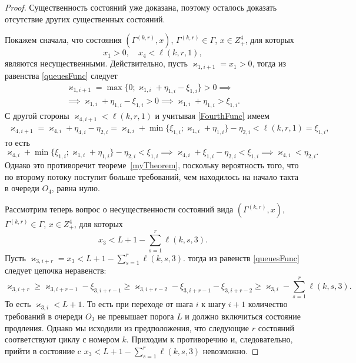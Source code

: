 \begin{proof}
Существенность состояний уже доказана,  поэтому осталось доказать отсутствие других существенных состояний.

Покажем сначала,  что состояния $(\Gamma^{(k, r)}, x)$,  $\Gamma^{(k, r)}\in \Gamma$,  $x\in Z^4_+$,  для которых 
\begin{equation*}
    x_1>0,  \quad x_4 < \ell(k, r, 1), 
\end{equation*}
являются несущественными. Действительно,  пусть $\varkappa_{1, i+1}=x_1 > 0$,  тогда из равенства \eqref{queuesFunc} следует
\begin{multline*}
    \varkappa_{1,  i+1} = \max \{0; \varkappa_{1,  i} + \eta_{1,  i}-\xi_{1,  i}\} > 0 \implies \\ 
    \implies \varkappa_{1,  i} + \eta_{1,  i}-\xi_{1,  i} > 0 \implies  \varkappa_{1,  i} + \eta_{1,  i} > \xi_{1,  i}.
\end{multline*}
С другой стороны $\varkappa_{4,  i+1} < \ell(k,  r,  1)$ и учитывая \eqref{FourthFunc} имеем 
\begin{multline*}
    \varkappa_{4,  i+1} = \varkappa_{4,  i} + \eta_{4,  i} - \eta_{2,  i} =  \varkappa_{4,  i} + \min\{\xi_{1,  i}; \varkappa_{1,  i}+\eta_{1,  i}\} - \eta_{2,  i}  < \ell(k,  r,  1) = \xi_{1,  i}, 
\end{multline*}
то есть 
\begin{equation*}
     \varkappa_{4,  i} + \min\{\xi_{1,  i}; \varkappa_{1,  i}+\eta_{1,  i}\} - \eta_{2,  i} < \xi_{1,  i} \implies      \varkappa_{4, i} + \xi_{1,  i}- \eta_{2,  i} < \xi_{1,  i} \implies  \varkappa_{4,  i} < \eta_{2,  i}.
\end{equation*}
Однако это противоречит теореме~\eqref{myTheorem},  поскольку вероятность того,  что по второму потоку поступит больше требований,  чем находилось на начало такта в очереди $O_4$,  равна нулю.

Рассмотрим теперь вопрос о несущественности состояний вида $(\Gamma^{(k,  r)},  x)$,  $\Gamma^{(k,  r)}\in \Gamma$,  $x\in Z^4_+$,  для которых 
\begin{equation*}
    x_3< L + 1 - \sum_{s=1}^r \ell(k, s, 3).
\end{equation*}
Пусть $\varkappa_{3,  i+r}=x_3 < L + 1 - \sum_{s=1}^r \ell(k,  s,  3)$. тогда из равенств \eqref{queuesFunc} следует цепочка неравенств:
\begin{equation*}
    \varkappa_{3, i+r} \geqslant \varkappa_{3,  i+r-1} - \xi_{3,  i+r-1} \geqslant \varkappa_{3,  i+r-2} - \xi_{3,  i+r-1}- \xi_{3,  i+r-2} \geqslant \varkappa_{3,  i} - \sum_{s=1}^r \ell(k,  s,  3).
\end{equation*}
То есть $\varkappa_{3,  i} < L + 1$. То есть при переходе от шага $i$ к шагу  $i+1$ количество требований в очереди $O_3$ не превышает порога $L$ и должно включиться состояние продления. Однако мы исходили из предположения,  что следующие $r$ состояний соответствуют циклу с номером $k$. Приходим к противоречию и,  следовательно,  прийти в состояние c $x_3< L + 1 - \sum_{s=1}^r \ell(k,  s,  3)$ невозможно.

\end{proof}
